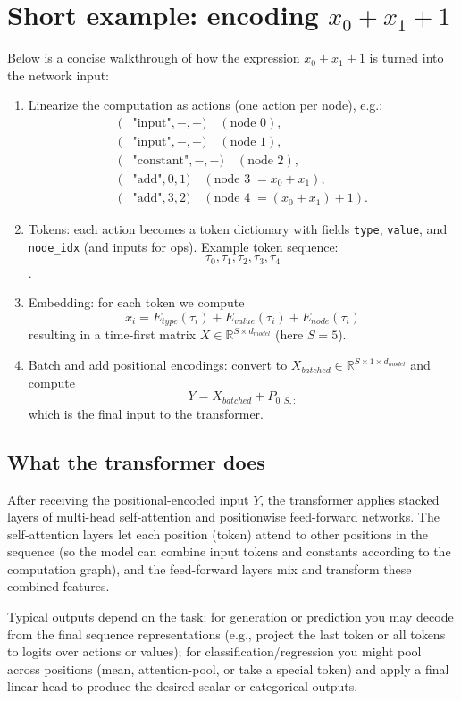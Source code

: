 \documentclass{article}
\begin{document}
\section*{Short example: encoding $x_0 + x_1 + 1$}
Below is a concise walkthrough of how the expression $x_0 + x_1 + 1$ is turned into the network input:
\begin{enumerate}
  \item Linearize the computation as actions (one action per node), e.g.:
    \begin{align*}
    (&\text{"input"}, -, -) \quad (\text{node }0),\\
    (&\text{"input"}, -, -) \quad (\text{node }1),\\
    (&\text{"constant"}, -, -) \quad (\text{node }2),\\
    (&\text{"add"}, 0, 1) \quad (\text{node }3 \; = x_0 + x_1),\\
    (&\text{"add"}, 3, 2) \quad (\text{node }4 \; = (x_0 + x_1) + 1).
    \end{align*}
  \item Tokens: each action becomes a token dictionary with fields \texttt{type}, \texttt{value}, and \texttt{node\_idx} (and inputs for ops). Example token sequence: 
    \[\tau_0, \tau_1, \tau_2, \tau_3, \tau_4\].
  \item Embedding: for each token we compute
    \[x_i = E_{type}(\tau_i) + E_{value}(\tau_i) + E_{node}(\tau_i)\]
    resulting in a time-first matrix $X \in \mathbb{R}^{S\times d_{model}}$ (here $S=5$).
  \item Batch and add positional encodings: convert to $X_{batched}\in\mathbb{R}^{S\times 1\times d_{model}}$ and compute
    \[Y = X_{batched} + P_{0:S,:}\]
    which is the final input to the transformer.
\end{enumerate}

\subsection*{What the transformer does}
After receiving the positional-encoded input $Y$, the transformer applies stacked layers of multi-head self-attention and positionwise feed-forward networks. The self-attention layers let each position (token) attend to other positions in the sequence (so the model can combine input tokens and constants according to the computation graph), and the feed-forward layers mix and transform these combined features.

Typical outputs depend on the task: for generation or prediction you may decode from the final sequence representations (e.g., project the last token or all tokens to logits over actions or values); for classification/regression you might pool across positions (mean, attention-pool, or take a special token) and apply a final linear head to produce the desired scalar or categorical outputs.
\end{document}
